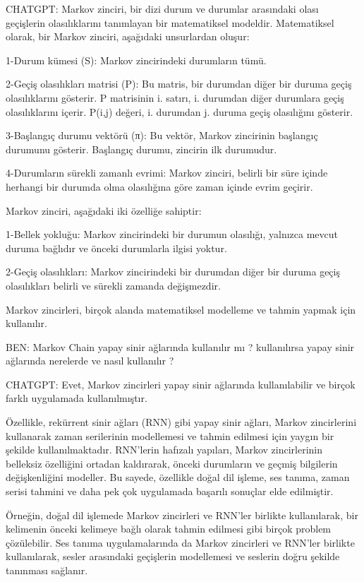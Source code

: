 \documentclass[11pt]{article}
\begin{document}
CHATGPT: Markov zinciri, bir dizi durum ve durumlar arasındaki olası geçişlerin olasılıklarını tanımlayan bir matematiksel modeldir. Matematiksel olarak, bir Markov zinciri, aşağıdaki unsurlardan oluşur:

1-Durum kümesi (S): Markov zincirindeki durumların tümü.

2-Geçiş olasılıkları matrisi (P): Bu matris, bir durumdan diğer bir duruma geçiş olasılıklarını gösterir. P matrisinin i. satırı, i. durumdan diğer durumlara geçiş olasılıklarını içerir. P(i,j) değeri, i. durumdan j. duruma geçiş olasılığını gösterir.

3-Başlangıç durumu vektörü (π): Bu vektör, Markov zincirinin başlangıç durumunu gösterir. Başlangıç durumu, zincirin ilk durumudur.

4-Durumların sürekli zamanlı evrimi: Markov zinciri, belirli bir süre içinde herhangi bir durumda olma olasılığına göre zaman içinde evrim geçirir.

Markov zinciri, aşağıdaki iki özelliğe sahiptir:

1-Bellek yokluğu: Markov zincirindeki bir durumun olasılığı, yalnızca mevcut duruma bağlıdır ve önceki durumlarla ilgisi yoktur.

2-Geçiş olasılıkları: Markov zincirindeki bir durumdan diğer bir duruma geçiş olasılıkları belirli ve sürekli zamanda değişmezdir.

Markov zincirleri, birçok alanda matematiksel modelleme ve tahmin yapmak için kullanılır.

BEN: Markov Chain yapay sinir ağlarında kullanılır mı ? kullanılırsa yapay sinir ağlarında nerelerde ve nasıl kullanılır ?

CHATGPT: Evet, Markov zincirleri yapay sinir ağlarında kullanılabilir ve birçok farklı uygulamada kullanılmıştır.

Özellikle, rekürrent sinir ağları (RNN) gibi yapay sinir ağları, Markov zincirlerini kullanarak zaman serilerinin modellemesi ve tahmin edilmesi için yaygın bir şekilde kullanılmaktadır. RNN'lerin hafızalı yapıları, Markov zincirlerinin belleksiz özelliğini ortadan kaldırarak, önceki durumların ve geçmiş bilgilerin değişkenliğini modeller. Bu sayede, özellikle doğal dil işleme, ses tanıma, zaman serisi tahmini ve daha pek çok uygulamada başarılı sonuçlar elde edilmiştir.

Örneğin, doğal dil işlemede Markov zincirleri ve RNN'ler birlikte kullanılarak, bir kelimenin önceki kelimeye bağlı olarak tahmin edilmesi gibi birçok problem çözülebilir. Ses tanıma uygulamalarında da Markov zincirleri ve RNN'ler birlikte kullanılarak, sesler arasındaki geçişlerin modellemesi ve seslerin doğru şekilde tanınması sağlanır.
\end{document}
